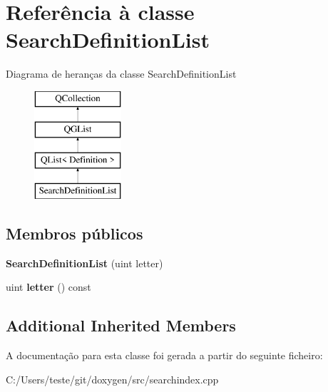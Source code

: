 \hypertarget{class_search_definition_list}{\section{Referência à classe Search\-Definition\-List}
\label{class_search_definition_list}
}
Diagrama de heranças da classe Search\-Definition\-List\begin{figure}[H]
\begin{center}
\leavevmode
\includegraphics[height=4.000000cm]{class_search_definition_list}
\end{center}
\end{figure}
\subsection*{Membros públicos}
\begin{DoxyCompactItemize}
\item 
\hypertarget{class_search_definition_list_a0466e60e590d0342b43efa40cfd5cf57}{{\bfseries Search\-Definition\-List} (uint letter)}\label{class_search_definition_list_a0466e60e590d0342b43efa40cfd5cf57}

\item 
\hypertarget{class_search_definition_list_ada472040436550156c7064317abe8caa}{uint {\bfseries letter} () const }\label{class_search_definition_list_ada472040436550156c7064317abe8caa}

\end{DoxyCompactItemize}
\subsection*{Additional Inherited Members}


A documentação para esta classe foi gerada a partir do seguinte ficheiro\-:\begin{DoxyCompactItemize}
\item 
C\-:/\-Users/teste/git/doxygen/src/searchindex.\-cpp\end{DoxyCompactItemize}
